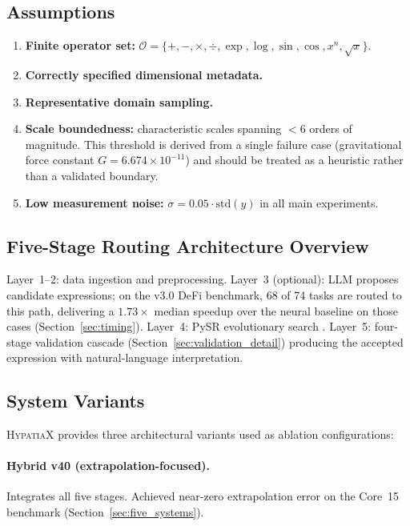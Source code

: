 \documentclass[twoside,11pt]{article}
\begin{document}
\subsection{Assumptions}
\label{sec:assumptions}

\begin{enumerate}
\item \textbf{Finite operator set:}
  $\mathcal{O} = \{+,-,\times,\div,\exp,\log,\sin,\cos,x^n,\sqrt{x}\}$.
\item \textbf{Correctly specified dimensional metadata.}
\item \textbf{Representative domain sampling.}
\item \textbf{Scale boundedness:} characteristic scales spanning
  $<6$ orders of magnitude.
  This threshold is derived from a single failure case (gravitational force
  constant $G = 6.674 \times 10^{-11}$) and should be treated as a heuristic
  rather than a validated boundary.
\item \textbf{Low measurement noise:}
  $\sigma = 0.05 \cdot \mathrm{std}(y)$ in all main experiments.
\end{enumerate}

\subsection{Five-Stage Routing Architecture Overview}
\label{sec:validation_framework}

Layer~1--2: data ingestion and preprocessing.
Layer~3 (optional): LLM proposes candidate expressions; on the v3.0 DeFi
benchmark, 68 of 74 tasks are routed to this path, delivering a $1.73\times$
median speedup over the neural baseline on those cases
(Section~\ref{sec:timing}).
Layer~4: PySR evolutionary search \citep{cranmer2023pysr}.
Layer~5: four-stage validation cascade (Section~\ref{sec:validation_detail})
producing the accepted expression with natural-language interpretation.

\subsection{System Variants}
\label{sec:arch_variants}

\textsc{HypatiaX} provides three architectural variants used as ablation
configurations:

\paragraph{Hybrid v40 (extrapolation-focused).}
Integrates all five stages.  Achieved near-zero extrapolation error on the
Core~15 benchmark (Section~\ref{sec:five_systems}).
\end{document}
